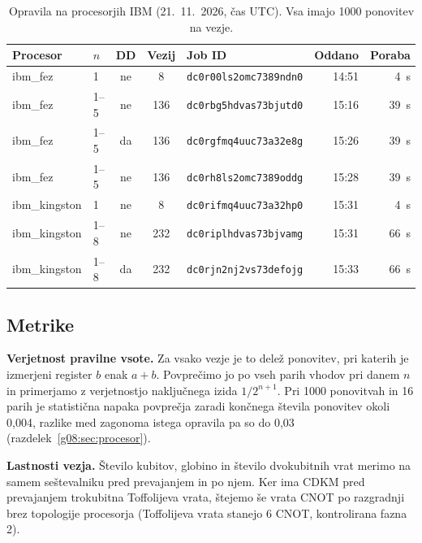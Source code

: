 \begin{table}[tbp]
\caption{Opravila na procesorjih IBM (21.~11.~2026, čas UTC). Vsa imajo 1000 ponovitev na vezje.}
\label{g08:tab:opravila}
\centering
\small
\begin{tabular}{llcclrr}
\toprule
Procesor & $n$ & DD & Vezij & Job ID & Oddano & Poraba \\
\midrule
ibm\_fez & 1 & ne & 8 & \texttt{dc0r00ls2omc7389ndn0} & 14:51 & 4~s \\
ibm\_fez & 1--5 & ne & 136 & \texttt{dc0rbg5hdvas73bjutd0} & 15:16 & 39~s \\
ibm\_fez & 1--5 & da & 136 & \texttt{dc0rgfmq4uuc73a32e8g} & 15:26 & 39~s \\
ibm\_fez & 1--5 & ne & 136 & \texttt{dc0rh8ls2omc7389oddg} & 15:28 & 39~s \\
ibm\_kingston & 1 & ne & 8 & \texttt{dc0rifmq4uuc73a32hp0} & 15:31 & 4~s \\
ibm\_kingston & 1--8 & ne & 232 & \texttt{dc0riplhdvas73bjvamg} & 15:31 & 66~s \\
ibm\_kingston & 1--8 & da & 232 & \texttt{dc0rjn2nj2vs73defojg} & 15:33 & 66~s \\
\bottomrule
\end{tabular}
\end{table}

\subsection{Metrike}
\label{g08:sec:metrike}

\smallskip\noindent\textbf{Verjetnost pravilne vsote.} Za vsako vezje je to delež ponovitev, pri katerih je izmerjeni register $b$ enak $a+b$. Povprečimo jo po vseh parih vhodov pri danem $n$ in primerjamo z verjetnostjo naključnega izida $1/2^{n+1}$. Pri 1000 ponovitvah in 16 parih je statistična napaka povprečja zaradi končnega števila ponovitev okoli 0,004, razlike med zagonoma istega opravila pa so do 0,03 (razdelek~\ref{g08:sec:procesor}).

\smallskip\noindent\textbf{Lastnosti vezja.} Število kubitov, globino in število dvokubitnih vrat merimo na samem seštevalniku pred prevajanjem in po njem. Ker ima CDKM pred prevajanjem trokubitna Toffolijeva vrata, štejemo še vrata CNOT po razgradnji brez topologije procesorja (Toffolijeva vrata stanejo 6 CNOT, kontrolirana fazna 2).

